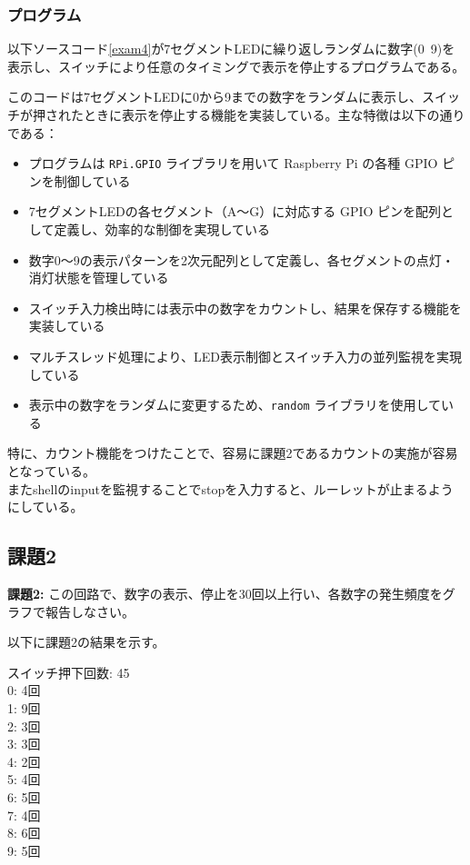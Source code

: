 \documentclass[a4paper,11pt,dvipdfmx]{jsarticle}
\begin{document}
\subsubsection{プログラム}
以下ソースコード\ref{exam4}が7セグメントLEDに繰り返しランダムに数字(0~9)を表示し、スイッチにより任意のタイミングで表示を停止するプログラムである。

このコードは7セグメントLEDに0から9までの数字をランダムに表示し、スイッチが押されたときに表示を停止する機能を実装している。主な特徴は以下の通りである：

\begin{itemize}
    \item プログラムは \texttt{RPi.GPIO} ライブラリを用いて Raspberry Pi の各種 GPIO ピンを制御している
    \item 7セグメントLEDの各セグメント（A～G）に対応する GPIO ピンを配列として定義し、効率的な制御を実現している
    \item 数字0～9の表示パターンを2次元配列として定義し、各セグメントの点灯・消灯状態を管理している
    \item スイッチ入力検出時には表示中の数字をカウントし、結果を保存する機能を実装している
    \item マルチスレッド処理により、LED表示制御とスイッチ入力の並列監視を実現している
    \item 表示中の数字をランダムに変更するため、\texttt{random} ライブラリを使用している
\end{itemize}

特に、カウント機能をつけたことで、容易に課題2であるカウントの実施が容易となっている。 \\
またshellのinputを監視することでstopを入力すると、ルーレットが止まるようにしている。

\subsection{課題2}
\begin{shaded}
    \noindent
    \textbf{課題2:} この回路で、数字の表示、停止を30回以上行い、各数字の発生頻度をグラフで報告しなさい。 

\end{shaded}
以下に課題2の結果を示す。\\
\begin{shaded}
\noindent
スイッチ押下回数: 45 \\
0: 4回 \\
1: 9回 \\
2: 3回 \\
3: 3回 \\
4: 2回 \\
5: 4回 \\
6: 5回 \\
7: 4回 \\
8: 6回 \\
9: 5回 
\end{shaded}
\end{document}
